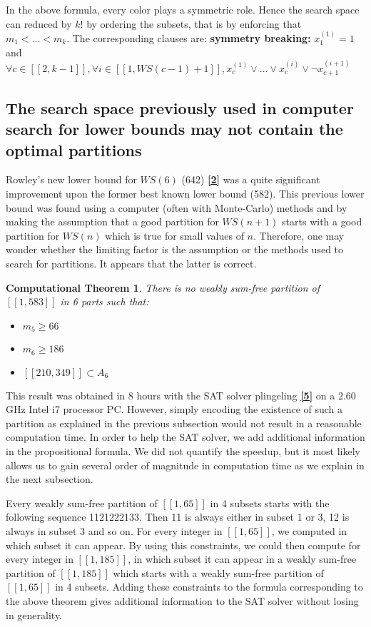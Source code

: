 \documentclass{article}
\newtheorem{computational theorem}{Computational Theorem}[section]
\begin{document}
In the above formula, every color plays a symmetric role. Hence the search space can reduced by \(k!\) by ordering the subsets, that is by 
enforcing that \(m_1 < ... < m_k\). The corresponding clauses are: \linebreak
\textbf{symmetry breaking:}  \(x^{(1)}_1 = 1\) and \(\forall c \in [\![2,k-1]\!], \forall i \in [\![1,WS(c - 1)+1]\!], x^{(1)}_c \lor ... \lor x^{(i)}_c \lor \neg x^{(i+1)}_{c+1}\)


\subsection{The search space previously used in computer search for lower bounds may not contain the optimal partitions}

Rowley's new lower bound for \(WS(6)\) (642)  \hyperlink{label2}{\textbf{[2]}} was a quite significant improvement upon the former 
best known lower bound (582). This previous lower bound was found using a computer (often with Monte-Carlo) methods and by making the 
assumption that a good partition for \(WS(n+1)\) starts with a good partition for \(WS(n)\) which is true for small values of \(n\).
Therefore, one may wonder whether the limiting factor is the assumption or the methods used to search for partitions. It appears that 
the latter is correct.

\begin{computational theorem}
There is no weakly sum-free partition of \([\![1,583]\!]\) in 6 parts such that:
\begin{itemize}
\item \(m_5 \ge 66\)
\item \(m_6 \ge 186\)
\item \([\![210,349]\!] \subset A_6\)
\end{itemize}  
\end{computational theorem}

This result was obtained in 8 hours with the SAT solver plingeling \hyperlink{label5}{\textbf{[5]}} on a 2.60 GHz Intel i7 processor PC.
However, simply encoding the existence of such a partition as explained in the previous subsection would not result in a reasonable 
computation time. In order to help the SAT solver, we add additional information in the propositional formula. We did not quantify the 
speedup, but it most likely allows us to gain several order of magnitude in computation time as we explain in the next subsection.

\par
Every weakly sum-free partition of \([\![1,65]\!]\) in 4 subsets starts with the following sequence 1121222133. Then 11 is always 
either in subset 1 or 3, 12 is always in subset 3 and so on. For every integer in \([\![1,65]\!]\), we computed in which subset it can appear. 
By using this constraints, we could then compute for every integer in \([\![1,185]\!]\), in which subset it can appear in a weakly sum-free 
partition of  \([\![1,185]\!]\) which starts with a  weakly sum-free partition of \([\![1,65]\!]\) in 4 subsets. Adding these constraints to the 
formula corresponding to the above theorem gives additional information to the SAT solver without losing in generality.
\end{document}
